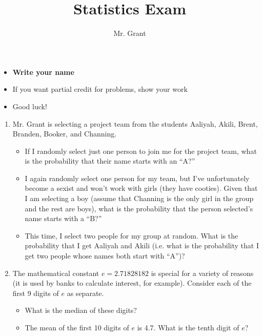 \documentclass[12pt]{article}
\begin{document}
\title{Statistics Exam}
\author{Mr. Grant}
\maketitle

\begin{itemize}
	\item \textbf{Write your name}
	\item If you want partial credit for problems, show your work
	\item Good luck!
\end{itemize}

\begin{enumerate}

	\item Mr. Grant is selecting a project team from the students Aaliyah, Akili, Brent, Branden, Booker, and Channing.
	\begin{itemize}
		\item If I randomly select just one person to join me for the project team, what is the probability that their name starts with an ``A?''
		\item I again randomly select one person for my team, but I've unfortunately become a sexist and won't work with girls (they have cooties). Given that I am selecting a boy (assume that Channing is the only girl in the group and the rest are boys), what is the probability that the person selected's name starts with a ``B?''
		\item This time, I select two people for my group at random. What is the probability that I get Aaliyah and Akili (i.e. what is the probability that I get two people whose names both start with ``A'')?
	\end{itemize}

	\item The mathematical constant $e = 2.71828182$ is special for a variety of reasons (it is used by banks to calculate interest, for example). Consider each of the first 9 digits of $e$ as separate.
	\begin{itemize}
		\item What is the median of these digits?
		\item The mean of the first 10 digits of $e$ is 4.7. What is the tenth digit of $e$?
	\end{itemize}


\end{enumerate}
\end{document}
